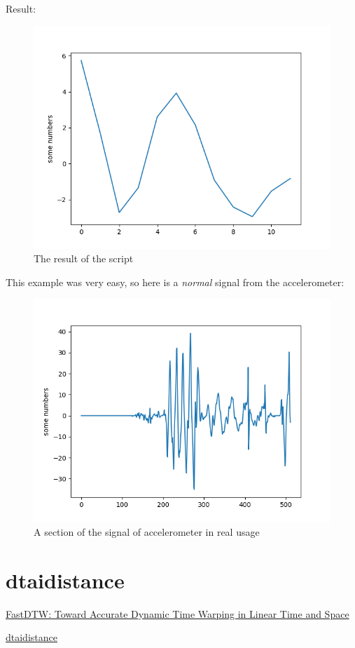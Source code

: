 \documentclass[12pt, a4paper, portrait]{article}
\begin{document}
Result:
\begin{figure}[ht]
\centering
\includegraphics[scale=1.00]{Figure_2.png}
\caption{The result of the script}
\end{figure}
\clearpage
This example was very easy, so here is a \textit{normal} signal from the accelerometer:
\begin{figure}[htp]
\centering
\includegraphics[scale=1.00]{Figure_1.png}
\caption{A section of the signal of accelerometer in real usage}
\end{figure}

\pagebreak
\section{dtaidistance}
\href{https://cs.fit.edu/~pkc/papers/tdm04.pdf}{FastDTW: Toward Accurate Dynamic Time Warping in Linear Time and Space}
\par\href{https://github.com/wannesm/dtaidistance}{dtaidistance}
\end{document}
